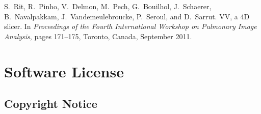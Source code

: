 \documentclass[]{report}
\begin{document}
\noindent[2] S.~Rit, R.~Pinho, V.~Delmon, M.~Pech, G.~Bouilhol, J.~Schaerer,
B.~Navalpakkam, J.~Vandemeulebroucke, P.~Seroul, and D.~Sarrut. {VV}, a {4D}
slicer. In {\em Proceedings of the Fourth International Workshop on Pulmonary
Image Analysis}, pages 171--175, Toronto, Canada, September 2011.




\chapter{Software License} \label{chp:License}

\section{Copyright Notice}
\end{document}
